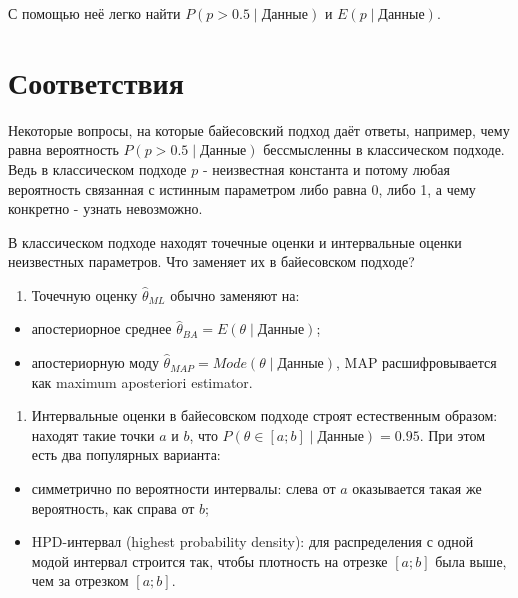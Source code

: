 \documentclass[11pt,russian,]{article}
\providecommand{\tightlist}{%
  \setlength{\itemsep}{0pt}\setlength{\parskip}{0pt}}
\begin{document}
С помощью неё легко найти \(P(p>0.5 \mid \text{Данные})\) и
\(E(p \mid \text{Данные})\).

\section{Соответствия}

Некоторые вопросы, на которые байесовский подход даёт ответы, например,
чему равна вероятность \(P(p>0.5 \mid \text{Данные})\) бессмысленны в
классическом подходе. Ведь в классическом подходе \(p\) - неизвестная
константа и потому любая вероятность связанная с истинным параметром
либо равна 0, либо 1, а чему конкретно - узнать невозможно.

В классическом подходе находят точечные оценки и интервальные оценки
неизвестных параметров. Что заменяет их в байесовском подходе?

\begin{enumerate}
\def\labelenumi{\arabic{enumi}.}
\tightlist
\item
  Точечную оценку \(\hat\theta_{ML}\) обычно заменяют на:
\end{enumerate}

\begin{itemize}
\tightlist
\item
  апостериорное среднее
  \(\hat\theta_{BA}=E(\theta \mid \text{Данные})\);
\item
  апостериорную моду
  \(\hat\theta_{MAP}=Mode(\theta \mid \text{Данные})\), MAP
  расшифровывается как maximum aposteriori estimator.
\end{itemize}

\begin{enumerate}
\def\labelenumi{\arabic{enumi}.}
\tightlist
\item
  Интервальные оценки в байесовском подходе строят естественным образом:
  находят такие точки \(a\) и \(b\), что
  \(P(\theta \in [a;b] \mid \text{Данные}) = 0.95\). При этом есть два
  популярных варианта:
\end{enumerate}

\begin{itemize}
\tightlist
\item
  симметрично по вероятности интервалы: слева от \(a\) оказывается такая
  же вероятность, как справа от \(b\);
\item
  HPD-интервал (highest probability density): для распределения с одной
  модой интервал строится так, чтобы плотность на отрезке \([a;b]\) была
  выше, чем за отрезком \([a;b]\).
\end{itemize}
\end{document}
